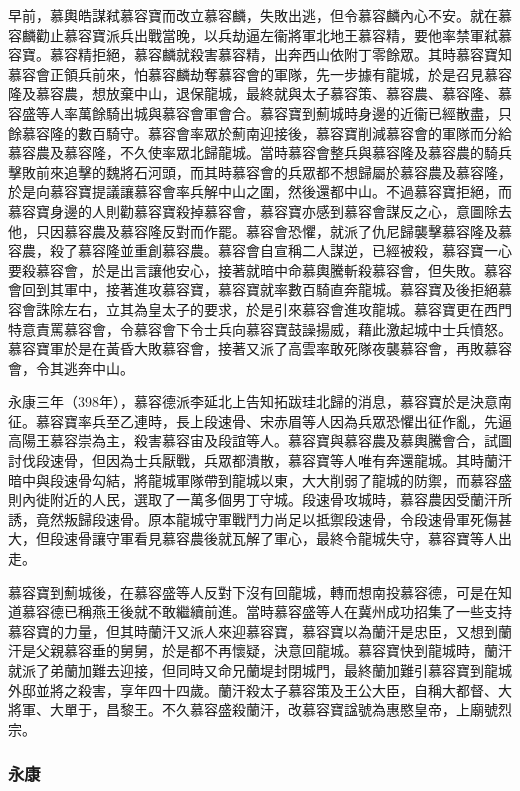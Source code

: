 早前，慕輿皓謀弒慕容寶而改立慕容麟，失敗出逃，但令慕容麟內心不安。就在慕容麟勸止慕容寶派兵出戰當晚，以兵劫逼左衞將軍北地王慕容精，要他率禁軍弒慕容寶。慕容精拒絕，慕容麟就殺害慕容精，出奔西山依附丁零餘眾。其時慕容寶知慕容會正領兵前來，怕慕容麟劫奪慕容會的軍隊，先一步據有龍城，於是召見慕容隆及慕容農，想放棄中山，退保龍城，最終就與太子慕容策、慕容農、慕容隆、慕容盛等人率萬餘騎出城與慕容會軍會合。慕容寶到薊城時身邊的近衞已經散盡，只餘慕容隆的數百騎守。慕容會率眾於薊南迎接後，慕容寶削減慕容會的軍隊而分給慕容農及慕容隆，不久使率眾北歸龍城。當時慕容會整兵與慕容隆及慕容農的騎兵擊敗前來追擊的魏將石河頭，而其時慕容會的兵眾都不想歸屬於慕容農及慕容隆，於是向慕容寶提議讓慕容會率兵解中山之圍，然後還都中山。不過慕容寶拒絕，而慕容寶身邊的人則勸慕容寶殺掉慕容會，慕容寶亦感到慕容會謀反之心，意圖除去他，只因慕容農及慕容隆反對而作罷。慕容會恐懼，就派了仇尼歸襲擊慕容隆及慕容農，殺了慕容隆並重創慕容農。慕容會自宣稱二人謀逆，已經被殺，慕容寶一心要殺慕容會，於是出言讓他安心，接著就暗中命慕輿騰斬殺慕容會，但失敗。慕容會回到其軍中，接著進攻慕容寶，慕容寶就率數百騎直奔龍城。慕容寶及後拒絕慕容會誅除左右，立其為皇太子的要求，於是引來慕容會進攻龍城。慕容寶更在西門特意責罵慕容會，令慕容會下令士兵向慕容寶鼓譟揚威，藉此激起城中士兵憤怒。慕容寶軍於是在黃昏大敗慕容會，接著又派了高雲率敢死隊夜襲慕容會，再敗慕容會，令其逃奔中山。

永康三年（398年），慕容德派李延北上告知拓跋珪北歸的消息，慕容寶於是決意南征。慕容寶率兵至乙連時，長上段速骨、宋赤眉等人因為兵眾恐懼出征作亂，先逼高陽王慕容崇為主，殺害慕容宙及段誼等人。慕容寶與慕容農及慕輿騰會合，試圖討伐段速骨，但因為士兵厭戰，兵眾都潰散，慕容寶等人唯有奔還龍城。其時蘭汗暗中與段速骨勾結，將龍城軍隊帶到龍城以東，大大削弱了龍城的防禦，而慕容盛則內徙附近的人民，選取了一萬多個男丁守城。段速骨攻城時，慕容農因受蘭汗所誘，竟然叛歸段速骨。原本龍城守軍戰鬥力尚足以抵禦段速骨，令段速骨軍死傷甚大，但段速骨讓守軍看見慕容農後就瓦解了軍心，最終令龍城失守，慕容寶等人出走。

慕容寶到薊城後，在慕容盛等人反對下沒有回龍城，轉而想南投慕容德，可是在知道慕容德已稱燕王後就不敢繼續前進。當時慕容盛等人在冀州成功招集了一些支持慕容寶的力量，但其時蘭汗又派人來迎慕容寶，慕容寶以為蘭汗是忠臣，又想到蘭汗是父親慕容垂的舅舅，於是都不再懷疑，決意回龍城。慕容寶快到龍城時，蘭汗就派了弟蘭加難去迎接，但同時又命兄蘭堤封閉城門，最終蘭加難引慕容寶到龍城外邸並將之殺害，享年四十四歲。蘭汗殺太子慕容策及王公大臣，自稱大都督、大將軍、大單于，昌黎王。不久慕容盛殺蘭汗，改慕容寶諡號為惠愍皇帝，上廟號烈宗。

\subsubsection{永康}

